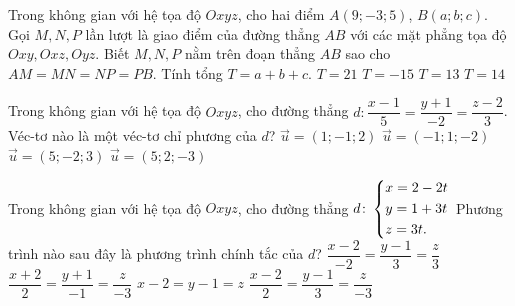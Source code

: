 \begin{ex}%
Trong không gian với hệ tọa độ $Oxyz$, cho hai điểm $A(9;-3;5)$, $B(a;b;c)$. Gọi $M, N, P$ lần lượt là giao điểm của đường thẳng $AB$ với các mặt phẳng tọa độ $Oxy, Oxz, Oyz$. Biết $M, N, P$ nằm trên đoạn thẳng $AB$ sao cho $AM=MN=NP=PB$. Tính tổng $T=a+b+c$.
\choice
{$T=21$}
{\True $T=-15$}
{$T=13$}
{$T=14$}
\end{ex}

\begin{ex}%
Trong không gian với hệ tọa độ $Oxyz$, cho đường thẳng $d\colon \dfrac{x-1}{5}=\dfrac{y+1}{-2}=\dfrac{z-2}{3}$. Véc-tơ nào là một véc-tơ chỉ phương của $d$?
\choice
{$\vec{u}=(1;-1;2)$}
{$\vec{u}=(-1;1;-2)$}
{\True $\vec{u}=(5;-2;3)$}
{$\vec{u}=(5;2;-3)$}
\end{ex}

\begin{ex}%
Trong không gian với hệ tọa độ $Oxyz$, cho đường thẳng $d\colon  \left\{\begin{aligned}&x=2-2t\\&y=1+3t\\&z=3t.\end{aligned}\right.$ Phương trình nào sau đây là phương trình chính tắc của $d$?
\choice
{\True $\dfrac{x-2}{-2}=\dfrac{y-1}{3}=\dfrac{z}{3}$}
{$\dfrac{x+2}{2}=\dfrac{y+1}{-1}=\dfrac{z}{-3}$}
{$x-2=y-1=z$}
{$\dfrac{x-2}{2}=\dfrac{y-1}{3}=\dfrac{z}{-3}$}
\end{ex}

